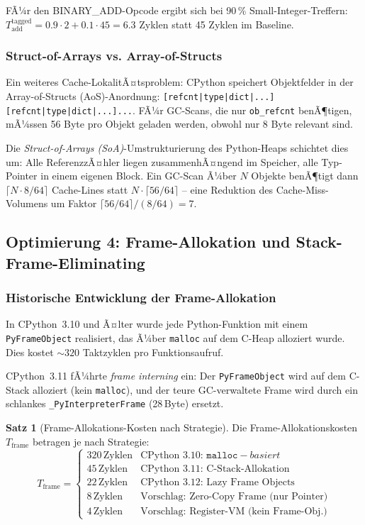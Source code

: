 ﻿\documentclass[a4paper,12pt]{scrreprt}
\theoremstyle{definition}
\newtheorem{satz}{Satz}[section]
\begin{document}
	FÃ¼r den BINARY\_ADD-Opcode ergibt sich bei 90\,\% Small-Integer-Treffern:
	$T_{\mathrm{add}}^{\mathrm{tagged}} = 0.9 \cdot 2 + 0.1 \cdot 45 = 6.3$
	Zyklen statt 45 Zyklen im Baseline.
	
	\subsubsection{Struct-of-Arrays vs. Array-of-Structs}
	
	Ein weiteres Cache-LokalitÃ¤tsproblem: CPython speichert Objektfelder
	in der Array-of-Structs (AoS)-Anordnung:\newline
	\texttt{[refcnt|type|dict|...][refcnt|type|dict|...]...}. FÃ¼r
	GC-Scans, die nur \texttt{ob\_refcnt} benÃ¶tigen, mÃ¼ssen 56 Byte
	pro Objekt geladen werden, obwohl nur 8 Byte relevant sind.
	
	Die \emph{Struct-of-Arrays (SoA)}-Umstrukturierung des Python-Heaps
	schichtet dies um: Alle ReferenzzÃ¤hler liegen zusammenhÃ¤ngend im
	Speicher, alle Typ-Pointer in einem eigenen Block. Ein GC-Scan Ã¼ber
	$N$ Objekte benÃ¶tigt dann $\lceil N \cdot 8 / 64 \rceil$ Cache-Lines
	statt $N \cdot \lceil 56/64 \rceil$ -- eine Reduktion des
	Cache-Miss-Volumens um Faktor $\lceil 56/64 \rceil / (8/64) = 7$.
	
	\subsection{Optimierung 4: Frame-Allokation und Stack-Frame-Eliminating}
	
	\subsubsection{Historische Entwicklung der Frame-Allokation}
	
	In CPython~3.10 und Ã¤lter wurde jede Python-Funktion mit einem
	\texttt{PyFrameObject} realisiert, das Ã¼ber \texttt{malloc} auf dem
	C-Heap alloziert wurde. Dies kostet $\sim 320$ Taktzyklen pro
	Funktionsaufruf.
	
	CPython~3.11 fÃ¼hrte \emph{frame interning} ein: Der \texttt{PyFrameObject}
	wird auf dem C-Stack alloziert (kein \texttt{malloc}), und der
	teure GC-verwaltete Frame wird durch ein schlankes
	\texttt{\_PyInterpreterFrame} (28\,Byte) ersetzt.
	
	\begin{satz}[Frame-Allokations-Kosten nach Strategie]
		\label{satz:frame_cost}
		Die Frame-Allokationskosten $T_{\mathrm{frame}}$ betragen je nach Strategie:
		\[
		T_{\mathrm{frame}} = \begin{cases}
			320\,\mathrm{Zyklen} & \text{CPython~3.10: } \texttt{malloc}-basiert \\
			45\,\mathrm{Zyklen}  & \text{CPython~3.11: C-Stack-Allokation} \\
			22\,\mathrm{Zyklen}  & \text{CPython~3.12: Lazy Frame Objects} \\
			8\,\mathrm{Zyklen}  & \text{Vorschlag: Zero-Copy Frame (nur Pointer)} \\
			4\,\mathrm{Zyklen}  & \text{Vorschlag: Register-VM (kein Frame-Obj.)}
		\end{cases}
		\]
	\end{satz}
	
\end{document}
